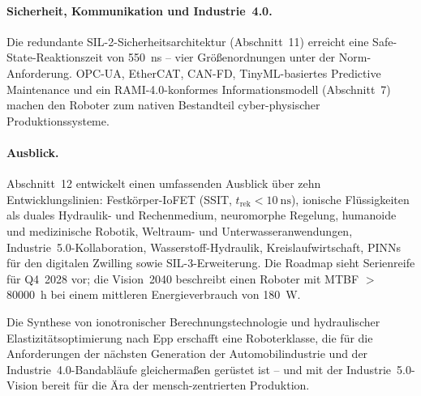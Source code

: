 ﻿\documentclass[a4paper,12pt]{scrreprt}
\theoremstyle{definition}
\begin{document}
\paragraph{Sicherheit, Kommunikation und Industrie~4.0.}
Die redundante SIL-2-Sicherheits\-architektur (Abschnitt~11) erreicht
eine Safe-State-Reaktionszeit von \SI{550}{\nano\second} -- vier
Größenordnungen unter der Norm-Anforderung. OPC-UA, EtherCAT, CAN-FD,
TinyML-basiertes Predictive Maintenance und ein RAMI-4.0-konformes
Informationsmodell (Abschnitt~7) machen den Roboter zum nativen
Bestandteil cyber-physischer Produktionssysteme.

\paragraph{Ausblick.}
Abschnitt~12 entwickelt einen umfassenden Ausblick über zehn
Entwicklungslinien: Festkörper-IoFET (SSIT, $t_{\text{rek}} <
\SI{10}{\nano\second}$), ionische Flüssigkeiten als duales
Hydraulik- und Rechenmedium, neuromorphe Regelung, humanoide und
medizinische Robotik, Weltraum- und Unterwasseranwendungen,
Industrie~5.0-Kollaboration, Wasserstoff-Hydraulik, Kreislaufwirtschaft,
PINNs für den digitalen Zwilling sowie SIL-3-Erweiterung.
Die Roadmap sieht Serienreife für Q4~2028 vor; die Vision~2040
beschreibt einen Roboter mit MTBF $>$\SI{80000}{\hour} bei einem
mittleren Energieverbrauch von \SI{180}{\watt}.

\medskip
Die Synthese von ionotronischer Berechnungstechnologie und
hydraulischer Elastizitätsoptimierung nach Epp erschafft eine
Roboterklasse, die für die Anforderungen der nächsten Generation
der Automobilindustrie und der Industrie~4.0-Bandabläufe
gleichermaßen gerüstet ist -- und mit der Industrie~5.0-Vision
bereit für die Ära der mensch-zentrierten Produktion.
\end{document}
